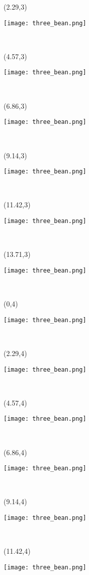 \documentclass[a4paper]{article}
\newcommand{\myXthreeBean}[0]{
\texttt{[image: three\_bean.png]}
}
\newcommand{\mycard}[5]{%
	\tiny #1 #2
	\hspace{-0.75cm} \large#3\\
}
\begin{document}
\begin{textblock}{2.29}(2.29,3)
\mycard{}{}{
\myXthreeBean
}{}{} 
\end{textblock}

\begin{textblock}{2.29}(4.57,3)
\mycard{}{}{
\myXthreeBean
}{}{} 
\end{textblock}

\begin{textblock}{2.29}(6.86,3)
\mycard{}{}{
\myXthreeBean
}{}{} 
\end{textblock}

\begin{textblock}{2.29}(9.14,3)
\mycard{}{}{
\myXthreeBean
}{}{} 
\end{textblock}

\begin{textblock}{2.29}(11.42,3)
\mycard{}{}{
\myXthreeBean
}{}{} 
\end{textblock}

\begin{textblock}{2.29}(13.71,3)
\mycard{}{}{
\myXthreeBean
}{}{} 
\end{textblock}


\begin{textblock}{2.29}(0,4)
\mycard{}{}{
\myXthreeBean
}{}{} 
\end{textblock}

\begin{textblock}{2.29}(2.29,4)
\mycard{}{}{
\myXthreeBean
}{}{} 
\end{textblock}

\begin{textblock}{2.29}(4.57,4)
\mycard{}{}{
\myXthreeBean
}{}{} 
\end{textblock}

\begin{textblock}{2.29}(6.86,4)
\mycard{}{}{
\myXthreeBean
}{}{} 
\end{textblock}

\begin{textblock}{2.29}(9.14,4)
\mycard{}{}{
\myXthreeBean
}{}{} 
\end{textblock}

\begin{textblock}{2.29}(11.42,4)
\mycard{}{}{
\myXthreeBean
}{}{} 
\end{textblock}
\end{document}
